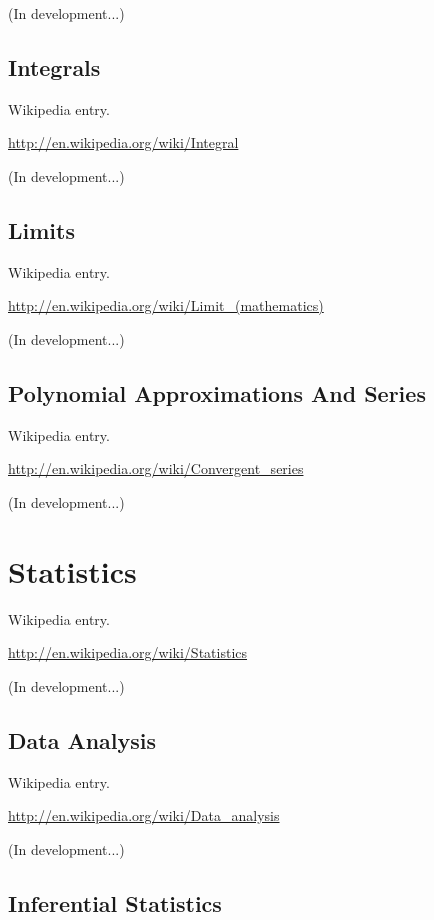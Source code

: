 \documentclass[12pt,twoside]{book}
\begin{document}
(In development...)

\subsection[Integrals]{Integrals}

Wikipedia entry.

\href{http://en.wikipedia.org/wiki/Integral}{http://en.wikipedia.org/wiki/Integral}

(In development...)

\subsection[Limits]{Limits}

Wikipedia entry.

\href{http://en.wikipedia.org/wiki/Limit_(mathematics)}{http://en.wikipedia.org/wiki/Limit\_(mathematics)}

(In development...)

\subsection[Polynomial Approximations And Series]{ Polynomial Approximations And Series}

Wikipedia entry.

\href{http://en.wikipedia.org/wiki/Convergent_series}{http://en.wikipedia.org/wiki/Convergent\_series}

(In development...)

\section[Statistics]{Statistics}

Wikipedia entry.

\href{http://en.wikipedia.org/wiki/Statistics}{http://en.wikipedia.org/wiki/Statistics}

(In development...)

\subsection[Data Analysis]{Data Analysis}

Wikipedia entry.

\href{http://en.wikipedia.org/wiki/Data_analysis}{http://en.wikipedia.org/wiki/Data\_analysis}

(In development...)

\subsection[Inferential Statistics]{Inferential Statistics}
\end{document}
